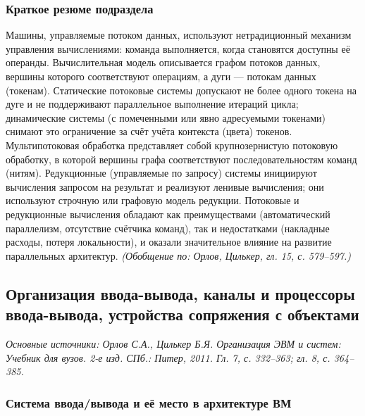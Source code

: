\documentclass[a4paper,12pt]{article}
\begin{document}
\subsubsection{Краткое резюме подраздела}
Машины, управляемые потоком данных, используют нетрадиционный механизм управления вычислениями: команда выполняется, когда становятся доступны её операнды. Вычислительная модель описывается графом потоков данных, вершины которого соответствуют операциям, а дуги — потокам данных (токенам). Статические потоковые системы допускают не более одного токена на дуге и не поддерживают параллельное выполнение итераций цикла; динамические системы (с помеченными или явно адресуемыми токенами) снимают это ограничение за счёт учёта контекста (цвета) токенов. Мультипотоковая обработка представляет собой крупнозернистую потоковую обработку, в которой вершины графа соответствуют последовательностям команд (нитям). Редукционные (управляемые по запросу) системы инициируют вычисления запросом на результат и реализуют ленивые вычисления; они используют строчную или графовую модель редукции. Потоковые и редукционные вычисления обладают как преимуществами (автоматический параллелизм, отсутствие счётчика команд), так и недостатками (накладные расходы, потеря локальности), и оказали значительное влияние на развитие параллельных архитектур.
\textit{(Обобщение по: Орлов, Цилькер, гл. 15, с. 579--597.)}

\subsection{Организация ввода-вывода, каналы и процессоры ввода-вывода, устройства сопряжения с объектами}

\noindent\textit{Основные источники: Орлов С.А., Цилькер Б.Я. Организация ЭВМ и систем: Учебник для вузов. 2-е изд. СПб.: Питер, 2011. Гл. 7, с. 332--363; гл. 8, с. 364--385.}

\subsubsection{Система ввода/вывода и её место в архитектуре ВМ}
\end{document}
